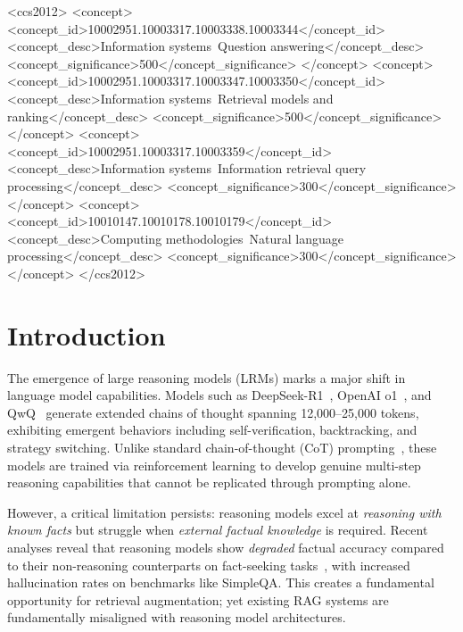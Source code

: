 \documentclass[sigconf,natbib=true]{acmart}
\begin{document}
\begin{CCSXML}
	<ccs2012>
	<concept>
	<concept_id>10002951.10003317.10003338.10003344</concept_id>
	<concept_desc>Information systems~Question answering</concept_desc>
	<concept_significance>500</concept_significance>
	</concept>
	<concept>
	<concept_id>10002951.10003317.10003347.10003350</concept_id>
	<concept_desc>Information systems~Retrieval models and ranking</concept_desc>
	<concept_significance>500</concept_significance>
	</concept>
	<concept>
	<concept_id>10002951.10003317.10003359</concept_id>
	<concept_desc>Information systems~Information retrieval query processing</concept_desc>
	<concept_significance>300</concept_significance>
	</concept>
	<concept>
	<concept_id>10010147.10010178.10010179</concept_id>
	<concept_desc>Computing methodologies~Natural language processing</concept_desc>
	<concept_significance>300</concept_significance>
	</concept>
	</ccs2012>
\end{CCSXML}


\maketitle

\section{Introduction}
\label{sec:intro}

The emergence of large reasoning models (LRMs) marks a major shift in language model capabilities. Models such as DeepSeek-R1~\cite{deepseek2025r1}, OpenAI o1~\cite{openai2024o1systemcard}, and QwQ~\cite{qwen2024qwq} generate extended chains of thought spanning 12,000--25,000 tokens, exhibiting emergent behaviors including self-verification, backtracking, and strategy switching. Unlike standard chain-of-thought (CoT) prompting~\cite{wei2022chain}, these models are trained via reinforcement learning to develop genuine multi-step reasoning capabilities that cannot be replicated through prompting alone.

However, a critical limitation persists: reasoning models excel at \emph{reasoning with known facts} but struggle when \emph{external factual knowledge} is required. Recent analyses reveal that reasoning models show \emph{degraded} factual accuracy compared to their non-reasoning counterparts on fact-seeking tasks~\cite{huang2025thinkingloud}, with increased hallucination rates on benchmarks like SimpleQA. This creates a fundamental opportunity for retrieval augmentation; yet existing RAG systems are fundamentally misaligned with reasoning model architectures.
\end{document}
